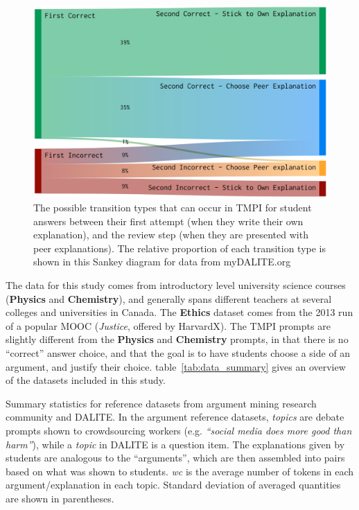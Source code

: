 \documentclass[notitlepage,12pt]{jedm}
\begin{document}
\begin{figure}
	\centering
	\includegraphics[width=0.7\linewidth]{img/transitions_final.png}
	\caption{The possible transition types that can occur in TMPI for student 
		answers between their first attempt (when they write their own 
		explanation), and the review step (when they are presented with peer 
		explanations). 
		The relative proportion of each transition type is shown in this Sankey 
		diagram for data from myDALITE.org}
	\label{fig:tmpi_sankey}
\end{figure}


The data for this study comes from introductory level university science 
courses (\textbf{Physics} and \textbf{Chemistry}), and generally spans 
different teachers at several colleges and universities in Canada. 
The \textbf{Ethics} dataset comes from the 2013 run of a popular MOOC 
(\textit{Justice}, offered by HarvardX).
The TMPI prompts are slightly different from the \textbf{Physics} and 
\textbf{Chemistry} prompts, in that there is no ``correct'' answer choice, and 
that the goal is to have students choose a side of an argument, and justify 
their choice.
table~\ref{tab:data_summary} gives an overview of the datasets included in this 
study.


\begin{table}
	\caption{
		Summary statistics for reference datasets from argument mining research 
		community and DALITE.
		In the argument reference datasets, \textit{topics} are debate prompts 
		shown to crowdsourcing workers (e.g. \textit{``social media does more 
			good than harm''}), while a \textit{topic} in DALITE is a question 
			item.
		The explanations given by students are analogous to the ``arguments'',  
		which are then assembled into pairs based on what was shown to students.
		\textit{wc} is the average number of tokens in each 
		argument/explanation in each topic.
		Standard deviation of averaged quantities are shown in
		parentheses.
	}
	\label{tab:data_summary}
	
\end{table}
\end{document}
